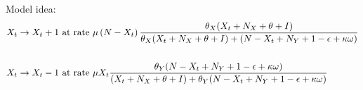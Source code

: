 \documentclass[10pt,a4paper]{article}
\begin{document}
Model idea:
\begin{align*}
\begin{split}
X_t \rightarrow X_t + 1 & \textnormal{ at rate } \mu\left(N-X_t\right)\frac{\theta_X (X_t + N_X + \theta + I)}{\theta_X (X_t + N_X + \theta + I) + (N - X_t + N_Y + 1-\epsilon + \kappa\omega)} \\
&\\
X_t \rightarrow X_t - 1 & \textnormal{ at rate } \mu X_t\frac{\theta_Y(N-X_t+N_Y+1-\epsilon+\kappa\omega)}{(X_t + N_X+\theta+I) + \theta_Y(N-X_t+N_Y+1-\epsilon+\kappa\omega)}
\end{split}
\end{align*}

\end{document}
